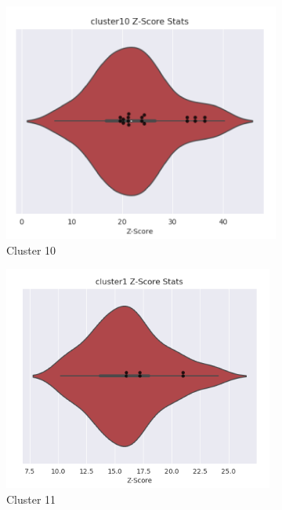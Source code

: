 \begin{figure}[htb]
\begin{subfigure}{0.2\textwidth}
  \includegraphics[width=\linewidth]{Pfam/cl10.png}
  \caption{Cluster 10}
  \label{fig:cl10}
\end{subfigure}\hfil %
\begin{subfigure}{0.2\textwidth}
  \includegraphics[width=\linewidth]{Pfam/cl11.png}
  \caption{Cluster 11}
  \label{fig:cl11}
\end{subfigure}\hfil %
\begin{subfigure}{0.2\textwidth}

\end{subfigure}
\end{figure}
